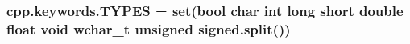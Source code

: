 \subsubsection[{\texorpdfstring{T\+Y\+P\+ES}{TYPES}}]{\setlength{\rightskip}{0pt plus 5cm}cpp.\+keywords.\+T\+Y\+P\+ES = {\bf set}(\textquotesingle{}bool char int long short double float void wchar\+\_\+t unsigned signed\textquotesingle{}.split())}\hypertarget{namespacecpp_1_1keywords_a56fd5baf357970548e1ec366edfc2c13}{}\label{namespacecpp_1_1keywords_a56fd5baf357970548e1ec366edfc2c13}
